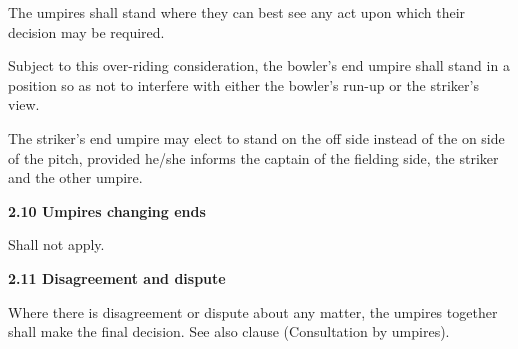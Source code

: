 \documentclass[12pt]{article}
\begin{document}
\vspace{\baselineskip}
{\fontsize{9pt}{10.8pt}\selectfont The umpires shall stand where they can best see any act upon which their decision may be required.\par}\par


\vspace{\baselineskip}
\begin{adjustwidth}{0.0in}{0.15in}
{\fontsize{9pt}{10.8pt}\selectfont Subject to this over-riding consideration, the bowler’s end umpire shall stand in a position so as not to interfere with either the bowler’s run-up or the striker’s view.\par}\par

\end{adjustwidth}


\vspace{\baselineskip}
\begin{adjustwidth}{0.0in}{0.01in}
{\fontsize{9pt}{10.8pt}\selectfont The striker’s end umpire may elect to stand on the off side instead of the on side of the pitch, provided he/she informs the captain of the fielding side, the striker and the other umpire.\par}\par

\end{adjustwidth}


\vspace{\baselineskip}
{\fontsize{11pt}{13.2pt}\selectfont \textbf{2.10 \tabto{0.47in} Umpires changing ends}\par}\par


\vspace{\baselineskip}
{\fontsize{9pt}{10.8pt}\selectfont Shall not apply.\par}\par


\vspace{\baselineskip}
{\fontsize{11pt}{13.2pt}\selectfont \textbf{2.11 \tabto{0.47in} Disagreement and dispute}\par}\par


\vspace{\baselineskip}
\begin{adjustwidth}{0.0in}{0.24in}
{\fontsize{9pt}{10.8pt}\selectfont Where there is disagreement or dispute about any matter, the umpires together shall make the final decision. See also clause (Consultation by umpires).\par}\par

\end{adjustwidth}
\end{document}
